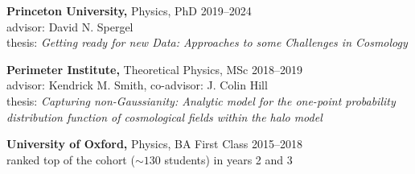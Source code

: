{\bf Princeton University,} Physics, PhD \hfill 2019--2024 \\
  advisor: David N. Spergel \\
  thesis: \emph{Getting ready for new Data: Approaches to some Challenges in Cosmology}
	
{\bf Perimeter Institute,} Theoretical Physics, MSc \hfill 2018--2019 \\
  advisor: Kendrick M. Smith, co-advisor: J. Colin Hill \\
  thesis: \emph{Capturing non-Gaussianity: Analytic model for the one-point probability distribution function of cosmological fields within the halo model}

{\bf University of Oxford,} Physics, BA First Class \hfill 2015--2018 \\
  ranked top of the cohort ($\sim 130$ students) in years 2 and 3
